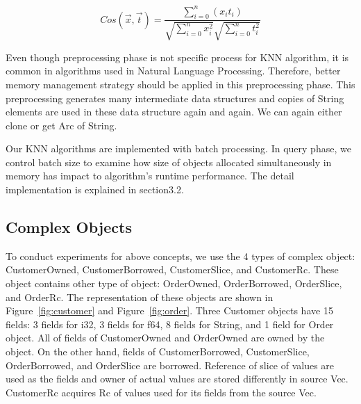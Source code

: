 \begin{equation} \label{eq:cosine}
    Cos(\vec{x}, \vec{t})
     = \frac{\sum_{i=0}^{n} (x_i t_i)}{\sqrt{\sum_{i=0}^{n} x_i^2}\sqrt{\sum_{i=0}^{n} t_i^2}}
\end{equation}

Even though preprocessing phase is not specific process for KNN algorithm, 
it is common in algorithms used in Natural Language Processing. Therefore, better memory management strategy should be applied in this preprocessing phase.
This preprocessing generates many intermediate data structures and copies of String elements are used in these data structure again and again. 
We can again either clone or get Arc of String. 

Our KNN algorithms are implemented with batch processing. In query phase, we control batch size to examine how size of objects allocated simultaneously in memory has impact to algorithm's runtime performance.
The detail implementation is explained in section3.2.

\subsection{Complex Objects}
\label{sec:concept_history}
To conduct experiments for above concepts, we use the 4 types of complex object: CustomerOwned, CustomerBorrowed, CustomerSlice, and CustomerRc. 
These object contains other type of object: OrderOwned, OrderBorrowed, OrderSlice, and OrderRc.
The representation of these objects are shown in Figure~\ref{fig:customer} and Figure~\ref{fig:order}. 
Three Customer objects have 15 fields: 3 fields for i32, 3 fields for f64, 8 fields for String, and 1 field for Order object.
All of fields of CustomerOwned and OrderOwned are owned by the object. On the other hand, fields of CustomerBorrowed, CustomerSlice, OrderBorrowed, and OrderSlice are borrowed. 
Reference of slice of values are used as the fields and owner of actual values are stored differently in source Vec. 
CustomerRc acquires Rc of values used for its fields from the source Vec.

